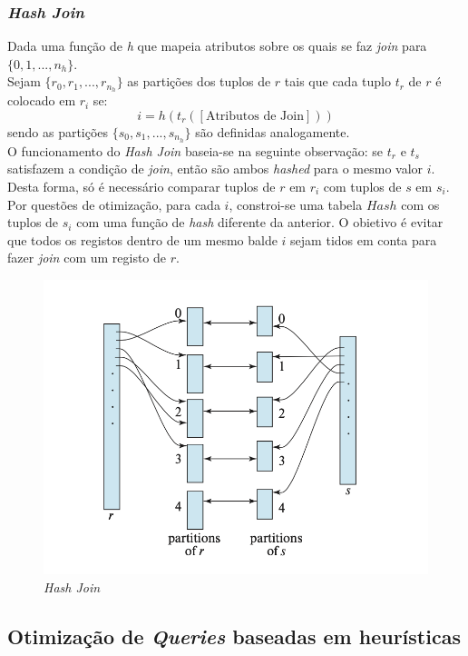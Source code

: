 \documentclass[oneside]{book}
\theoremstyle{definition}
\begin{document}
\subsubsection*{\textit{Hash Join}}

Dada uma função de \textit{h} que mapeia atributos sobre os quais se faz \textit{join} para $\{0, 1, ..., n_h \}$.\\
Sejam $\{r_0, r_1, ..., r_{n_h}\}$ as partições dos tuplos de $r$ tais que cada tuplo $t_r$ de $r$ é colocado em $r_i$ se:
\[
    i = h(t_r([\text{Atributos de Join}]))
    \]
sendo as partições $\{s_0, s_1, ..., s_{n_h}\}$ são definidas analogamente. \\
O funcionamento do \textit{Hash Join} baseia-se na seguinte observação: se $t_r$ e $t_s$ satisfazem a condição de \textit{join}, então são ambos \textit{hashed} para o mesmo valor $i$. Desta forma, só é necessário comparar tuplos de $r$ em $r_i$ com tuplos de $s$ em $s_i$. \\
Por questões de otimização, para cada $i$, constroi-se uma tabela $Hash$ com os tuplos de $s_i$ com uma função de \textit{hash} diferente da anterior. O obietivo é evitar que todos os registos dentro de um mesmo balde $i$ sejam tidos em conta para fazer \textit{join} com um registo de $r$.

\begin{figure}[H]
    \centering
    \includegraphics[scale = 0.50]{cap_indices/hash_join.png}
    \caption{\textit{Hash Join}}
\end{figure}

\subsection{Otimização de \textit{Queries} baseadas em heurísticas}
\end{document}
